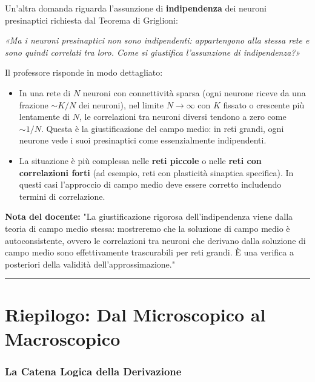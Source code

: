 Un'altra domanda riguarda l'assunzione di \textbf{indipendenza} dei neuroni presinaptici richiesta dal Teorema di Griglioni:

\textit{«Ma i neuroni presinaptici non sono indipendenti: appartengono alla stessa rete e sono quindi correlati tra loro. Come si giustifica l'assunzione di indipendenza?»}

Il professore risponde in modo dettagliato:

\begin{itemize}
    \item In una rete di $N$ neuroni con connettività sparsa (ogni neurone riceve da una frazione $\sim K/N$ dei neuroni), nel limite $N \to \infty$ con $K$ fissato o crescente più lentamente di $N$, le correlazioni tra neuroni diversi tendono a zero come $\sim 1/N$. Questa è la giustificazione del campo medio: in reti grandi, ogni neurone vede i suoi presinaptici come essenzialmente indipendenti.
    \item La situazione è più complessa nelle \textbf{reti piccole} o nelle \textbf{reti con correlazioni forti} (ad esempio, reti con plasticità sinaptica specifica). In questi casi l'approccio di campo medio deve essere corretto includendo termini di correlazione.
\end{itemize}

\begin{tcolorbox}[colback=gray!5, colframe=gray!40, arc=2mm, boxrule=0.5pt]
\textbf{Nota del docente:} "La giustificazione rigorosa dell'indipendenza viene dalla teoria di campo medio stessa: mostreremo che la soluzione di campo medio è autoconsistente, ovvero le correlazioni tra neuroni che derivano dalla soluzione di campo medio sono effettivamente trascurabili per reti grandi. È una verifica a posteriori della validità dell'approssimazione."
\end{tcolorbox}

\vspace{0.5cm}
\noindent\rule{\textwidth}{0.4pt}
\vspace{0.5cm}

\section{Riepilogo: Dal Microscopico al Macroscopico}

\subsubsection{La Catena Logica della Derivazione}

